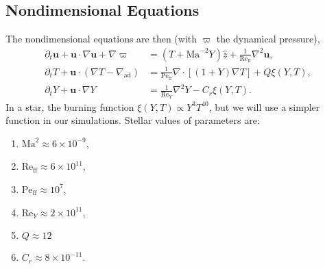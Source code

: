 \documentclass[onecolumn, amsmath, amsfonts, amssymb]{aastex62}
\newcommand{\grad}{\ensuremath{\nabla}}
\renewcommand{\vec}[1]{\ensuremath{\mathbf{#1}}}
\renewcommand{\dot}{\ensuremath{\cdot}}
\begin{document}
\subsection{Nondimensional Equations}
The nondimensional equations are then (with $\varpi$ the dynamical pressure),
\begin{align}
\partial_t \vec{u} + \vec{u}\dot\grad\vec{u} + \grad \varpi  &= (T + \mathrm{Ma}^{-2}Y)\hat{z} + \frac{1}{\mathrm{Re}_{\mathrm{ff}}}\grad^2 \vec{u},\\
\partial_t T + \bm{u}\dot(\grad T - \grad_{\mathrm{ad}}) &= \frac{1}{\mathrm{Pe}_{\mathrm{ff}}}\grad\dot[(1 + Y)\grad T] + Q \xi(Y,T),\\
\partial_t Y + \bm{u}\dot\grad Y &= \frac{1}{\mathrm{Re}_Y}\grad^2 Y - C_r \xi(Y,T).
\end{align}
In a star, the burning function $\xi(Y,T) \propto Y^3 T^{40}$, but we will use a simpler function in our simulations.
Stellar values of parameters are:
\begin{enumerate}
\item $\mathrm{Ma}^2 \approx 6 \times 10^{-9}$,
\item $\mathrm{Re}_\mathrm{ff} \approx 6 \times 10^{11}$,
\item $\mathrm{Pe}_\mathrm{ff} \approx 10^7$,
\item $\mathrm{Re}_Y \approx 2 \times 10^{11}$,
\item $Q   \approx 12$
\item $C_r \approx 8 \times 10^{-11}$.
\end{enumerate}
\end{document}
